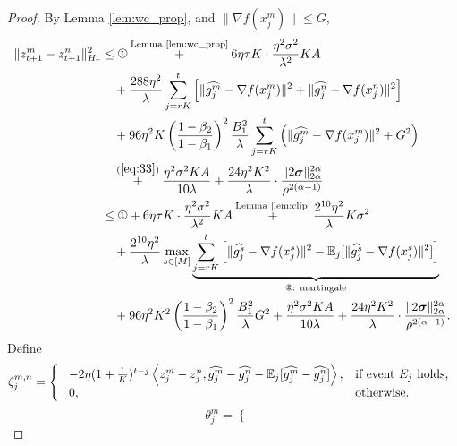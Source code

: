 \documentclass{article} %
\numberwithin{equation}{section}
\newcommand{\cirone}{\text{\ding{172}}}
\newcommand{\cirtwo}{\text{\ding{173}}}
\renewcommand{\eqref}[1]{(\ref{#1})}
\begin{document}
\begin{proof}
    By Lemma \ref{lem:wc_prop}, and $\|\nabla f(x_j^m)\|\leq G$,
    \begin{equation}\label{eq:21}
        \begin{aligned}
            \|z_{t+1}^m-z_{t+1}^n\|_{H_r}^2 
            &\leq \cirone \overset{\text{Lemma \ref{lem:wc_prop}}}{+} 6\eta\tau K \cdot \frac{\eta^2\sigma^2}{\lambda^2}KA\\
            &\quad + \frac{288\eta^2}{\lambda}\sum_{j=rK}^{t}\left[\|\widehat{g_j^m}-\nabla f(x_j^m)\|^2+\|\widehat{g_j^n}-\nabla f(x_j^n)\|^2\right] \\
            &\quad + 96\eta^2K\left(\frac{1-\beta_2}{1-\beta_1}\right)^2\frac{B_1^2}{\lambda}\sum_{j=rK}^{t}\left(\|\widehat{g_j^m}-\nabla f(x_j^m)\|^2 + G^2\right) \\
            &\quad \overset{\eqref{eq:33}}{+}\frac{\eta^2\sigma^2KA}{10\lambda}+ \frac{24\eta^2K^2}{\lambda}\cdot \frac{\|2\boldsymbol{\sigma}\|_{2\alpha}^{2\alpha}}{\rho^{2(\alpha-1)}} \\
            &\leq \cirone + 6\eta\tau K \cdot \frac{\eta^2\sigma^2}{\lambda^2}KA \overset{\text{Lemma \ref{lem:clip}}}{+}\frac{2^{10}\eta^2}{\lambda}K\sigma^2\\
            &\quad + \frac{2^{10}\eta^2}{\lambda}\max_{s\in[M]}\underbrace{\sum_{j=rK}^{t}\left[\|\widehat{g_j^s}-\nabla f(x_j^s)\|^2-\expect_j[\|\widehat{g_j^s}-\nabla f(x_j^s)\|^2]\right]}_{\cirtwo\text{: martingale}} \\
            &\quad + 96\eta^2K^2\left(\frac{1-\beta_2}{1-\beta_1}\right)^2\frac{B_1^2}{\lambda}G^2 +\frac{\eta^2\sigma^2KA}{10\lambda}+ \frac{24\eta^2K^2}{\lambda}\cdot \frac{\|2\boldsymbol{\sigma}\|_{2\alpha}^{2\alpha}}{\rho^{2(\alpha-1)}}.
        \end{aligned}
    \end{equation}
    Define 
    \begin{equation}
        \zeta_j^{m,n} = \left\{\
        \begin{array}{ll}
            -2\eta(1+\frac{1}{K})^{t-j} \left\langle z_j^m-z_j^n, \widehat{g_j^m}-\widehat{g_j^n}-\mathbb{E}_j[\widehat{g_j^m}-\widehat{g_j^n}] \right\rangle, & \text{if event $E_j$ holds,} \\
            0, & \text{otherwise.} 
        \end{array}
        \right.
    \end{equation}
    \begin{equation}
        \theta_j^m = \left\{\
        \begin{array}{ll}

\end{array}
\end{equation}
\end{proof}
\end{document}

